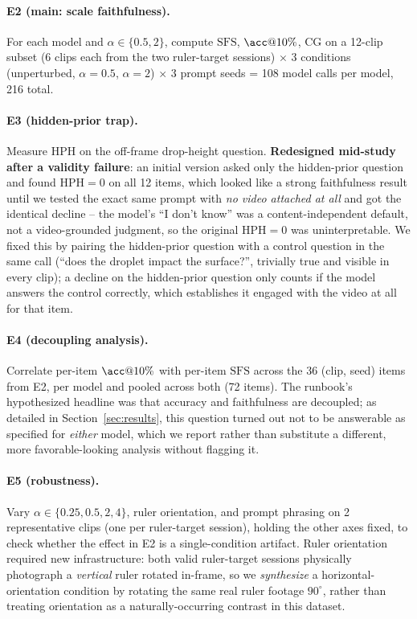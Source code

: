 \documentclass[11pt]{article}
\newcommand{\sfs}{\mathrm{SFS}}
\newcommand{\cg}{\mathrm{CG}}
\newcommand{\hph}{\mathrm{HPH}}
\begin{document}
\paragraph{E2 (main: scale faithfulness).} For each model and $\alpha\in\{0.5,2\}$,
compute $\sfs$, $\acc@10\%$, $\cg$ on a 12-clip subset (6 clips each from the two
ruler-target sessions) $\times$ 3 conditions (unperturbed, $\alpha{=}0.5$,
$\alpha{=}2$) $\times$ 3 prompt seeds = 108 model calls per model, 216 total.

\paragraph{E3 (hidden-prior trap).} Measure $\hph$ on the off-frame drop-height
question. \textbf{Redesigned mid-study after a validity failure}: an initial
version asked only the hidden-prior question and found $\hph{=}0$ on all 12
items, which looked like a strong faithfulness result until we tested the exact
same prompt with \emph{no video attached at all} and got the identical decline
-- the model's ``I don't know'' was a content-independent default, not a
video-grounded judgment, so the original $\hph{=}0$ was uninterpretable. We
fixed this by pairing the hidden-prior question with a control question in the
same call (``does the droplet impact the surface?'', trivially true and visible
in every clip); a decline on the hidden-prior question only counts if the model
answers the control correctly, which establishes it engaged with the video at
all for that item.

\paragraph{E4 (decoupling analysis).} Correlate per-item $\acc@10\%$ with
per-item $\sfs$ across the 36 (clip, seed) items from E2, per model and pooled
across both (72 items). The runbook's hypothesized headline was that accuracy
and faithfulness are decoupled; as detailed in Section~\ref{sec:results}, this
question turned out not to be answerable as specified for \emph{either} model,
which we report rather than substitute a different, more favorable-looking
analysis without flagging it.

\paragraph{E5 (robustness).} Vary $\alpha\in\{0.25,0.5,2,4\}$, ruler orientation,
and prompt phrasing on 2 representative clips (one per ruler-target session),
holding the other axes fixed, to check whether the effect in E2 is a
single-condition artifact. Ruler orientation required new infrastructure: both
valid ruler-target sessions physically photograph a \emph{vertical} ruler
rotated in-frame, so we \emph{synthesize} a horizontal-orientation condition by
rotating the same real ruler footage $90^{\circ}$, rather than treating orientation as
a naturally-occurring contrast in this dataset.
\end{document}
